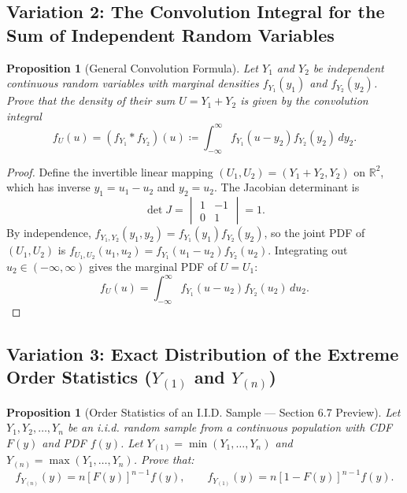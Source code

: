 \documentclass[11pt, letterpaper]{article}
\newtheorem{proposition}[theorem]{Proposition}
\theoremstyle{definition}
\theoremstyle{remark}
\newcommand{\R}{\mathbb{R}}
\begin{document}
\subsection{Variation 2: The Convolution Integral for the Sum of Independent Random Variables}

\begin{proposition}[General Convolution Formula]
Let $Y_1$ and $Y_2$ be independent continuous random variables with marginal densities $f_{Y_1}(y_1)$ and $f_{Y_2}(y_2)$. Prove that the density of their sum $U = Y_1 + Y_2$ is given by the convolution integral
\[
    f_U(u) = (f_{Y_1} * f_{Y_2})(u) \coloneqq \int_{-\infty}^{\infty} f_{Y_1}(u - y_2) f_{Y_2}(y_2) \, dy_2.
\]
\end{proposition}

\begin{proof}
Define the invertible linear mapping $(U_1, U_2) = (Y_1 + Y_2, Y_2)$ on $\R^2$, which has inverse $y_1 = u_1 - u_2$ and $y_2 = u_2$. The Jacobian determinant is
\[
    \det J = \begin{vmatrix} 1 & -1 \\ 0 & 1 \end{vmatrix} = 1.
\]
By independence, $f_{Y_1, Y_2}(y_1, y_2) = f_{Y_1}(y_1)f_{Y_2}(y_2)$, so the joint PDF of $(U_1, U_2)$ is $f_{U_1, U_2}(u_1, u_2) = f_{Y_1}(u_1 - u_2)f_{Y_2}(u_2)$. Integrating out $u_2 \in (-\infty, \infty)$ gives the marginal PDF of $U = U_1$:
\[
    f_U(u) = \int_{-\infty}^{\infty} f_{Y_1}(u - u_2) f_{Y_2}(u_2) \, du_2.
\]
\end{proof}

\subsection{Variation 3: Exact Distribution of the Extreme Order Statistics ($Y_{(1)}$ and $Y_{(n)}$)}

\begin{proposition}[Order Statistics of an I.I.D. Sample — Section 6.7 Preview]
Let $Y_1, Y_2, \dots, Y_n$ be an i.i.d. random sample from a continuous population with CDF $F(y)$ and PDF $f(y)$. Let $Y_{(1)} = \min(Y_1, \dots, Y_n)$ and $Y_{(n)} = \max(Y_1, \dots, Y_n)$. Prove that:
\[
    f_{Y_{(n)}}(y) = n \left[F(y)\right]^{n-1} f(y), \qquad f_{Y_{(1)}}(y) = n \left[1 - F(y)\right]^{n-1} f(y).
\]
\end{proposition}
\end{document}
